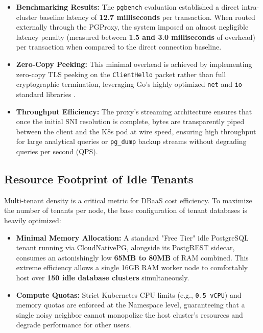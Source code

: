 \begin{itemize}
    \item \textbf{Benchmarking Results:} The \texttt{pgbench} evaluation established a direct intra-cluster baseline latency of \textbf{12.7 milliseconds} per transaction. When routed externally through the PGProxy, the system imposed an almost negligible latency penalty (measured between \textbf{1.5 and 3.0 milliseconds} of overhead) per transaction when compared to the direct connection baseline.
    \item \textbf{Zero-Copy Peeking:} This minimal overhead is achieved by implementing zero-copy TLS peeking on the \texttt{ClientHello} packet rather than full cryptographic termination, leveraging Go's highly optimized \texttt{net} and \texttt{io} standard libraries \cite{go_net_performance}.
    \item \textbf{Throughput Efficiency:} The proxy's streaming architecture ensures that once the initial SNI resolution is complete, bytes are transparently piped between the client and the K8s pod at wire speed, ensuring high throughput for large analytical queries or \texttt{pg\_dump} backup streams without degrading queries per second (QPS).
\end{itemize}

\subsection{Resource Footprint of Idle Tenants}
Multi-tenant density is a critical metric for DBaaS cost efficiency. To maximize the number of tenants per node, the base configuration of tenant databases is heavily optimized:
\begin{itemize}
    \item \textbf{Minimal Memory Allocation:} A standard "Free Tier" idle PostgreSQL tenant running via CloudNativePG, alongside its PostgREST sidecar, consumes an astonishingly low \textbf{65MB to 80MB} of RAM combined. This extreme efficiency allows a single 16GB RAM worker node to comfortably host over \textbf{150 idle database clusters} simultaneously.
    \item \textbf{Compute Quotas:} Strict Kubernetes CPU limits (e.g., \texttt{0.5 vCPU}) and memory quotas are enforced at the Namespace level, guaranteeing that a single noisy neighbor cannot monopolize the host cluster's resources and degrade performance for other users.
\end{itemize}
